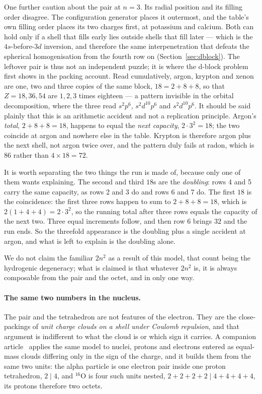 \documentclass[11pt]{article}
\begin{document}
One further caution about the pair at $n=3$. Its radial position and its filling order disagree.
The configuration generator places it outermost, and the table's own filling order places its two
charges first, at potassium and calcium. Both can hold only if a shell that fills early lies
outside shells that fill later --- which is the $4s$-before-$3d$ inversion, and therefore the
same interpenetration that defeats the spherical homogenisation from the fourth row on
(Section~\ref{sec:dblock}). The leftover pair is thus not an independent puzzle; it is where the
d-block problem first shows in the packing account. Read cumulatively, argon, krypton and xenon are one, two and
three copies of the same block, $18=2{+}8{+}8$, so that $Z=18,36,54$ are $1,2,3$ times eighteen
--- a pattern invisible in the orbital decomposition, where the three read $s^2p^6$,
$s^2d^{10}p^6$ and $s^2d^{10}p^6$. It should be said plainly that this is an arithmetic accident
and not a replication principle. Argon's \emph{total}, $2{+}8{+}8=18$, happens to equal the
\emph{next capacity}, $2\cdot3^2=18$; the two coincide at argon and nowhere else in the table.
Krypton is therefore argon plus the next shell, not argon twice over, and the pattern duly fails
at radon, which is $86$ rather than $4\times18=72$.

It is worth separating the two things the run is made of, because only one of them wants explaining.
The second and third $18$s are the \emph{doubling}: rows 4 and 5 carry the same capacity, as rows 2
and 3 do and rows 6 and 7 do. The first $18$ is the coincidence: the first three rows happen to sum
to $2{+}8{+}8=18$, which is $2(1+4+4)=2\cdot3^2$, so the running total after three rows equals the
capacity of the next two. Three equal increments follow, and then row 6 brings $32$ and the run ends.
So the threefold appearance is the doubling plus a single accident at argon, and what is left to
explain is the doubling alone.

We do not claim the familiar $2n^2$ as a result of this model, that count being the hydrogenic
degeneracy; what is claimed is that whatever $2n^2$ is, it is always composable from the pair
and the octet, and in only one way.

\paragraph{The same two numbers in the nucleus.} The pair and the tetrahedron are not features of
the electron. They are the close-packings of \emph{unit charge clouds on a shell under Coulomb
repulsion}, and that argument is indifferent to what the cloud is or which sign it carries. A
companion article~\cite{Johnson-RealNucleus} applies the same model to nuclei, protons and
electrons entered as equal-mass clouds differing only in the sign of the charge, and it builds
them from the same two units: the alpha particle is one electron pair inside one proton
tetrahedron, $2\mid 4$, and $^{16}$O is four such units nested,
$2{+}2{+}2{+}2\mid 4{+}4{+}4{+}4$, its protons therefore two octets.
\end{document}
